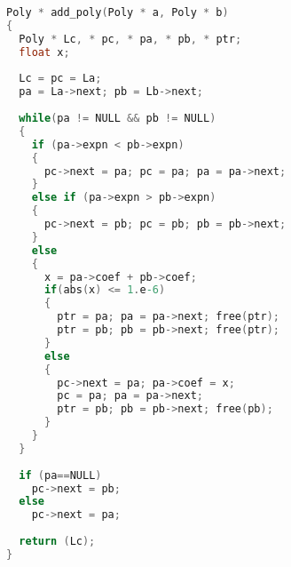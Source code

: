 \begin{frame}
\begin{lstlisting}[language=C,basicstyle=\ttfamily\small,extendedchars=false]
Poly * add_poly(Poly * a, Poly * b)
{
  Poly * Lc, * pc, * pa, * pb, * ptr; 
  float x;
  
  Lc = pc = La; 
  pa = La->next; pb = Lb->next;
  
  while(pa != NULL && pb != NULL)
  {
    if (pa->expn < pb->expn)
    {
      pc->next = pa; pc = pa; pa = pa->next;
    } 
    else if (pa->expn > pb->expn)
    {
      pc->next = pb; pc = pb; pb = pb->next;
    } 
    else 
    {
      x = pa->coef + pb->coef;
      if(abs(x) <= 1.e-6)
      {
        ptr = pa; pa = pa->next; free(ptr);
        ptr = pb; pb = pb->next; free(ptr);
      } 
      else 
      {
        pc->next = pa; pa->coef = x; 
        pc = pa; pa = pa->next;
        ptr = pb; pb = pb->next; free(pb);
      }
    }
  }
  
  if (pa==NULL) 
    pc->next = pb;
  else 
    pc->next = pa;
    
  return (Lc);
}
\end{lstlisting}
\end{frame}	
